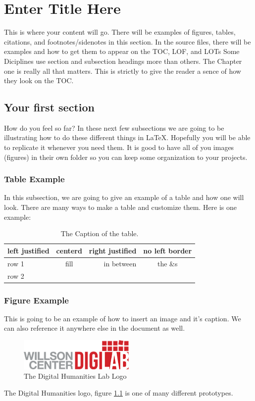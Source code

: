 \documentclass[./dissertation.tex]{subfiles}
\begin{document}
    \chapter{Enter Title Here}
    This is where your content will go. There will be examples of figures, tables, citations, and footnotes/sidenotes in this section. In the source files, there will be examples and how to get them to appear on the TOC, LOF, and LOTs Some Diciplines use section and subsection headings more than others. The Chapter one is really all that matters. This is strictly to give the reader a sence of how they look on the TOC.
    \section{Your first section}
      How do you feel so far? In these next few subsections we are going to be illustrating how to do these different things in LaTeX. Hopefully you will be able to replicate it whenever you need them.
      It is good to have all of you images (figures) in their own folder so you can keep some organization to your projects.

      \subsection{Table Example}
        In this subsection, we are going to give an example of a table and how one will look. There are many ways to make a table and customize them. Here is one example:


      \begin{table}[ht]
        \centering
      \begin{tabular}[c]{|l|c|rc|}
        \hline
        left justified  & centerd  & right justified  & no left border\\
        \hline
        row 1 & fill & in between & the \&s\\
        row 2 & & &\\
        \hline

      \end{tabular}
      \caption{The Caption of the table.}
      \label{table:someTable}
      \end{table}



      \subsection{Figure Example}
      This is going to be an example of how to insert an image and it's caption. We can also reference it anywhere else in the document as well.
      \begin{figure}[h]
        \centering\includegraphics[width=0.5\textwidth]{figures/digilab_logo}
        \caption{The Digital Humanities Lab Logo}
        \label{fig:digilogo}
      \end{figure}
      The Digital Humanities logo, figure \ref{fig:digilogo} is one of many different prototypes.
\end{document}
